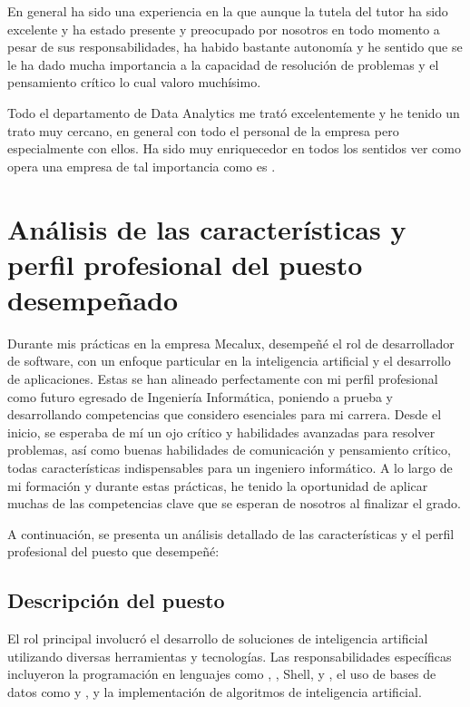 En general ha sido una experiencia en la que aunque la tutela del tutor ha sido excelente y ha estado presente y preocupado por nosotros en todo momento a pesar de sus responsabilidades, ha habido bastante autonomía y he sentido que se le ha dado mucha importancia a la capacidad de resolución de problemas y el pensamiento crítico lo cual valoro muchísimo.

Todo el departamento de Data Analytics me trató excelentemente y he tenido un trato muy cercano, en general con todo el personal de la empresa pero especialmente con ellos. Ha sido muy enriquecedor en todos los sentidos ver como opera una empresa de tal importancia como es \href{https://www.mecalux.es/}{}. 

\section{Análisis de las características y perfil profesional del puesto desempeñado}

Durante mis prácticas en la empresa Mecalux, desempeñé el rol de desarrollador de software, con un enfoque particular en la inteligencia artificial y el desarrollo de aplicaciones. Estas se han alineado perfectamente con mi perfil profesional como futuro egresado de Ingeniería Informática, poniendo a prueba y desarrollando competencias que considero esenciales para mi carrera. Desde el inicio, se esperaba de mí un ojo crítico y habilidades avanzadas para resolver problemas, así como buenas habilidades de comunicación y pensamiento crítico, todas características indispensables para un ingeniero informático. A lo largo de mi formación y durante estas prácticas, he tenido la oportunidad de aplicar muchas de las competencias clave que se esperan de nosotros al finalizar el grado. 

A continuación, se presenta un análisis detallado de las características y el perfil profesional del puesto que desempeñé:

\subsection{Descripción del puesto}
El rol principal involucró el desarrollo de soluciones de inteligencia artificial utilizando diversas herramientas y tecnologías. Las responsabilidades específicas incluyeron la programación en lenguajes como \href{https://dotnet.microsoft.com/es-es/languages/csharp}{}, \href{https://www.python.org/}{}, Shell, \href{https://en.wikipedia.org/wiki/C_(programming_language)}{} y \href{https://en.wikipedia.org/wiki/C%2B%2B}{\bold{C++}}, el uso de bases de datos como \href{https://www.sqlite.org/}{\bold{SQLite}} y \href{https://www.postgresql.org/}{\bold{PostgreSQL}}, y la implementación de algoritmos de inteligencia artificial.
\newpage
